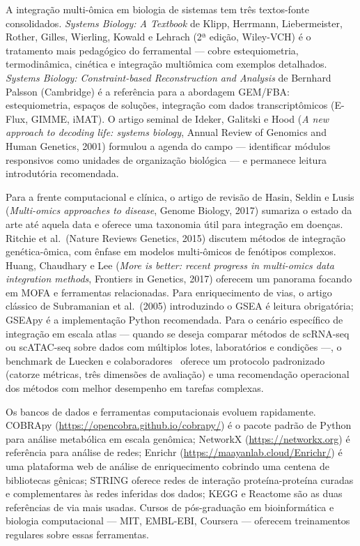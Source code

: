 {A integração multi-ômica em biologia de sistemas tem três textos-fonte
consolidados. \textit{Systems Biology: A Textbook} de Klipp, Herrmann,
Liebermeister, Rother, Gilles, Wierling, Kowald e Lehrach (2ª edição,
Wiley-VCH) é o tratamento mais pedagógico do ferramental --- cobre
estequiometria, termodinâmica, cinética e integração multiômica com
exemplos detalhados. \textit{Systems Biology: Constraint-based
Reconstruction and Analysis} de Bernhard Palsson (Cambridge) é a referência
para a abordagem GEM/FBA: estequiometria, espaços de soluções, integração
com dados transcriptômicos (E-Flux, GIMME, iMAT). O artigo seminal de
Ideker, Galitski e Hood (\textit{A new approach to decoding life: systems
biology}, Annual Review of Genomics and Human Genetics, 2001) formulou
a agenda do campo --- identificar módulos responsivos como unidades de
organização biológica --- e permanece leitura introdutória recomendada.

Para a frente computacional e clínica, o artigo de revisão de Hasin,
Seldin e Lusis (\textit{Multi-omics approaches to disease}, Genome Biology,
2017) sumariza o estado da arte até aquela data e oferece uma taxonomia
útil para integração em doenças. Ritchie et al.\ (Nature Reviews Genetics,
2015) discutem métodos de integração genética-ômica, com ênfase em modelos
multi-ômicos de fenótipos complexos. Huang, Chaudhary e Lee (\textit{More is
better: recent progress in multi-omics data integration methods}, Frontiers
in Genetics, 2017) oferecem um panorama focando em MOFA e ferramentas
relacionadas. Para enriquecimento de vias, o artigo clássico de
Subramanian et al.\ (2005) introduzindo o GSEA é leitura obrigatória;
GSEApy é a implementação Python recomendada. Para o cenário específico
de integração em escala atlas --- quando se deseja comparar métodos
de scRNA-seq ou scATAC-seq sobre dados com múltiplos lotes, laboratórios
e condições ---, o benchmark de Luecken e
colaboradores~\cite{luecken2022} oferece um protocolo padronizado
(catorze métricas, três dimensões de avaliação) e uma recomendação
operacional dos métodos com melhor desempenho em tarefas complexas.

Os bancos de dados e ferramentas computacionais evoluem rapidamente.
COBRApy (\url{https://opencobra.github.io/cobrapy/}) é o pacote padrão de
Python para análise metabólica em escala genômica; NetworkX
(\url{https://networkx.org}) é referência para análise de redes; Enrichr
(\url{https://maayanlab.cloud/Enrichr/}) é uma plataforma web de análise
de enriquecimento cobrindo uma centena de bibliotecas gênicas; STRING
oferece redes de interação proteína-proteína curadas e complementares às
redes inferidas dos dados; KEGG e Reactome são as duas referências de via
mais usadas. Cursos de pós-graduação em bioinformática e biologia
computacional --- MIT, EMBL-EBI, Coursera --- oferecem treinamentos
regulares sobre essas ferramentas.

}
